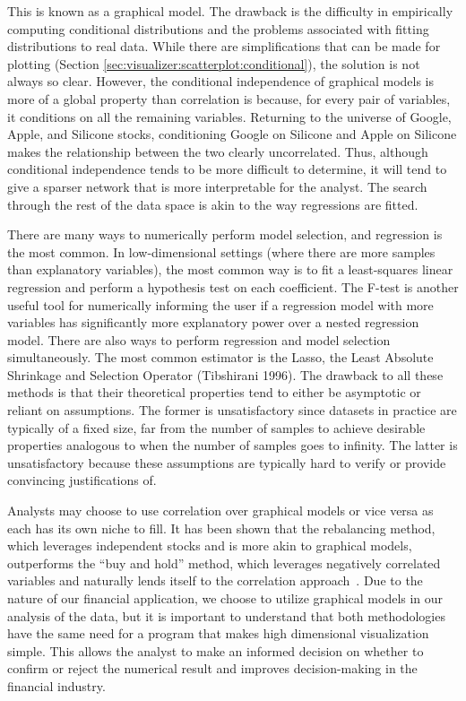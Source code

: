 This is known as a graphical model. The drawback is the difficulty in empirically computing conditional distributions and the problems associated with fitting distributions to real data. While there are simplifications that can be made for plotting (Section \ref{sec:visualizer:scatterplot:conditional}), the solution is not always so clear. However, the conditional independence of graphical models is more of a global property than correlation is because, for every pair of variables, it conditions on all the remaining variables. Returning to the universe of Google, Apple, and Silicone stocks, conditioning Google on Silicone and Apple on Silicone makes the relationship between the two clearly uncorrelated. Thus, although conditional independence tends to be more difficult to determine, it will tend to give a sparser network that is more interpretable for the analyst. The search through the rest of the data space is akin to the way regressions are fitted.

There are many ways to numerically perform model selection, and regression is the most common. In low-dimensional settings (where there are more samples than explanatory variables), the most common way is to fit a least-squares linear regression and perform a hypothesis test on each coefficient. The F-test is another useful tool for numerically informing the user if a regression model with more variables has significantly more explanatory power over a nested regression model. There are also ways to perform regression and model selection simultaneously. The most common estimator is the Lasso, the Least Absolute Shrinkage and Selection Operator (Tibshirani 1996). The drawback to all these methods is that their theoretical properties tend to either be asymptotic or reliant on assumptions. The former is unsatisfactory since datasets in practice are typically of a fixed size, far from the number of samples to achieve desirable properties analogous to when the number of samples goes to infinity. The latter is unsatisfactory because these assumptions are typically hard to verify or provide convincing justifications of.

Analysts may choose to use correlation over graphical models or vice versa as each has its own niche to fill. It has been shown that the rebalancing method, which leverages independent stocks and is more akin to graphical models, outperforms the ``buy and hold'' method, which leverages negatively correlated variables and naturally lends itself to the correlation approach~\cite{liuh2016}. Due to the nature of our financial application, we choose to utilize graphical models in our analysis of the data, but it is important to understand that both methodologies have the same need for a program that makes high dimensional visualization simple. This allows the analyst to make an informed decision on whether to confirm or reject the numerical result and improves decision-making in the financial industry.

